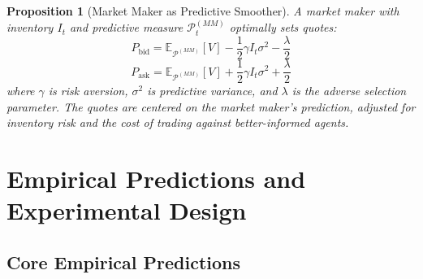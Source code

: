 \documentclass[12pt,a4paper]{article}
\newtheorem{proposition}[theorem]{Proposition}
\theoremstyle{definition}
\newcommand{\E}{\mathbb{E}}
\newcommand{\PP}{\mathcal{P}}
\begin{document}
\begin{proposition}[Market Maker as Predictive Smoother]\label{prop:mm_smoother}
A market maker with inventory $I_t$ and predictive measure $\PP^{(MM)}_t$ optimally sets quotes:
\begin{equation}
    P_{\text{bid}} = \E_{\PP^{(MM)}}[V] - \frac{1}{2}\gamma I_t \sigma^2 - \frac{\lambda}{2}
\end{equation}
\begin{equation}
    P_{\text{ask}} = \E_{\PP^{(MM)}}[V] + \frac{1}{2}\gamma I_t \sigma^2 + \frac{\lambda}{2}
\end{equation}
where $\gamma$ is risk aversion, $\sigma^2$ is predictive variance, and $\lambda$ is the adverse selection parameter. The quotes are centered on the market maker's prediction, adjusted for inventory risk and the cost of trading against better-informed agents.
\end{proposition}



\section{Empirical Predictions and Experimental Design}\label{sec:empirical}

\subsection{Core Empirical Predictions}
\end{document}
